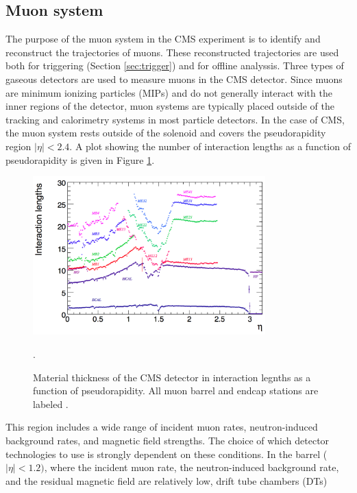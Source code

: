 \subsection{Muon system}
\label{sec:muon}

The purpose of the muon system in the CMS experiment is to identify and reconstruct the trajectories of muons.
These reconstructed trajectories are used both for triggering (Section \ref{sec:trigger}) and 
for offline analyssis.
Three types of gaseous detectors are used to measure muons in the CMS detector.
Since muons are minimum ionizing particles (MIPs) 
and do not generally interact with the inner regions of the 
detector, muon systems are typically placed outside of the tracking and calorimetry systems
in most particle detectors.
In the case of CMS, the muon system rests outside of the solenoid and covers the pseudorapidity 
region $|\eta| < 2.4$.
A plot showing the number of interaction lengths as a function of pseudorapidity 
is given in Figure \ref{fig:muon-interaction-lengths}.
\begin{figure}
  \centering
    \includegraphics[width=0.8\textwidth]{tex/cms/fig/muon-interaction-lengths.png}
  \caption{Material thickness of the CMS detector in interaction legnths as a function of pseudorapidity.
    All muon barrel and endcap stations are labeled \cite{cms-jinst}.}
  \label{fig:muon-interaction-lengths}.
\end{figure}
This region includes a wide range of incident muon rates,
neutron-induced background rates, and magnetic field strengths.  The choice 
of which detector technologies to use is strongly dependent on these conditions.
In the barrel ($|\eta| < 1.2)$, where the incident muon rate, the neutron-induced background rate, and
the residual magnetic field are relatively low, drift tube chambers (DTs)
